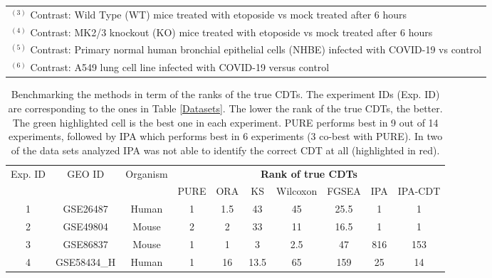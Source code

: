 \documentclass[Minh_PhD_thesis.tex]{subfiles}
\begin{document}
\begin{table}
\begin{center}
\begin{tabular}{ c|cccc }
 \multicolumn{5}{l}{\tiny $^{(3)}$ Contrast: Wild Type (WT) mice treated with etoposide vs mock treated after 6 hours}\\
 \multicolumn{5}{l}{\tiny $^{(4)}$ Contrast: MK2/3 knockout (KO) mice treated with etoposide vs mock treated after 6 hours}\\
 \multicolumn{5}{l}{\tiny $^{(5)}$ Contrast: Primary normal human bronchial epithelial cells (NHBE) infected with COVID-19 vs control}\\
 \multicolumn{5}{l}{\tiny $^{(6)}$ Contrast: A549 lung cell line infected with COVID-19 versus control}\\
\end{tabular}
\end{center}
\end{table}


\begin{table}
\caption{\label{Ranks} Benchmarking the methods in term of the ranks of the true CDTs. The experiment IDs (Exp. ID) are corresponding to the ones in Table \ref{Datasets}. The lower the rank of the true CDTs, the better.  The green highlighted cell is the best one in each experiment. PURE performs best in 9 out of 14 experiments, followed by IPA which performs best in 6 experiments (3 co-best with PURE). In two of the data sets analyzed IPA was not able to identify the correct CDT at all  (highlighted in red).}
\begin{center}
\scriptsize
\begin{tabular}{ ccc|ccccccc } 

 \hline \hline

\multirow{2}{*}{Exp. ID}& \multirow{2}{*}{GEO ID}& \multirow{2}{*}{Organism} & \multicolumn{7}{c}{\textbf{Rank of true CDTs}} \\
&  && PURE  & ORA & KS  & Wilcoxon & FGSEA & IPA& IPA-CDT\\
\hline
1	& GSE26487& Human &	\cellcolor{green}1	&	1.5	&	43	&	45	&	25.5	& \cellcolor{green}1&	\cellcolor{green}1\\ 

2	& GSE49804& Mouse	&	2	&	2	&	33	&	11	&	16.5	&	\cellcolor{green}1 & \cellcolor{green}1\\ 

3	& GSE86837& Mouse	&	\cellcolor{green}1	&	\cellcolor{green}1	&	3	&	2.5	&	47	&	816& 153\\ 

4	& GSE58434\_H& Human &	\cellcolor{green}1	&	16	&	13.5	&	65	&	159	&	25 & 14\\ 


\end{tabular}
\end{center}
\end{table}
\end{document}
